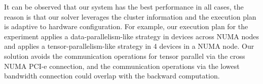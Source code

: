 


It can be observed that our system has the best performance in all cases, the reason is that our solver leverages the cluster information and the execution plan is adaptive to hardware configuration. For example, our execution plan for the experiment applies a data-parallelism-like strategy in devices across NUMA nodes and applies a tensor-parallelism-like strategy in 4 devices in a NUMA node. Our solution avoids the communication operations for tensor parallel via the cross NUMA PCI-e connection, and the communication operations via the lowest bandwidth connection could overlap with the backward computation.